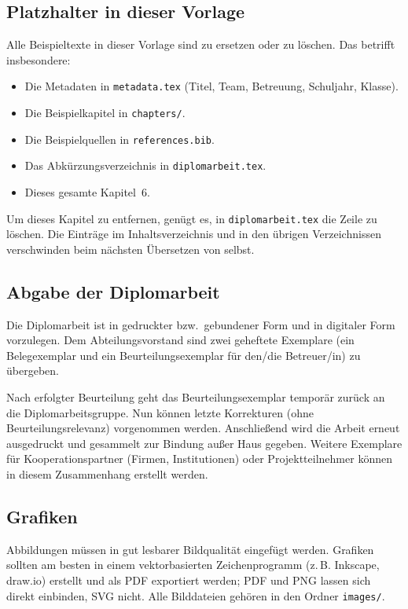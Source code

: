 \subsection{Platzhalter in dieser Vorlage}

Alle Beispieltexte in dieser Vorlage sind zu ersetzen oder zu löschen. Das
betrifft insbesondere:

\begin{itemize}
  \item Die Metadaten in \lstinline|metadata.tex| (Titel, Team, Betreuung,
        Schuljahr, Klasse).
  \item Die Beispielkapitel in \lstinline|chapters/|.
  \item Die Beispielquellen in \lstinline|references.bib|.
  \item Das Abkürzungsverzeichnis in \lstinline|diplomarbeit.tex|.
  \item Dieses gesamte Kapitel~6.
\end{itemize}

Um dieses Kapitel zu entfernen, genügt es, in \lstinline|diplomarbeit.tex|
die Zeile \lstinline|| zu löschen. Die Einträge
im Inhaltsverzeichnis und in den übrigen Verzeichnissen verschwinden beim
nächsten Übersetzen von selbst.

\subsection{Abgabe der Diplomarbeit}

Die Diplomarbeit ist in gedruckter bzw.\ gebundener Form und in digitaler
Form vorzulegen. Dem Abteilungsvorstand sind zwei geheftete Exemplare (ein
Belegexemplar und ein Beurteilungsexemplar für den/die Betreuer/in) zu
übergeben.

Nach erfolgter Beurteilung geht das Beurteilungsexemplar temporär zurück an
die Diplomarbeitsgruppe. Nun können letzte Korrekturen (ohne
Beurteilungsrelevanz) vorgenommen werden. Anschließend wird die Arbeit erneut
ausgedruckt und gesammelt zur Bindung außer Haus gegeben. Weitere Exemplare
für Kooperationspartner (Firmen, Institutionen) oder Projektteilnehmer können
in diesem Zusammenhang erstellt werden.

\subsection{Grafiken}

Abbildungen müssen in gut lesbarer Bildqualität eingefügt werden. Grafiken
sollten am besten in einem vektorbasierten Zeichenprogramm (z.\,B. Inkscape,
draw.io) erstellt und als PDF exportiert werden; PDF und PNG lassen sich
direkt einbinden, SVG nicht. Alle Bilddateien gehören in den Ordner
\lstinline|images/|.

